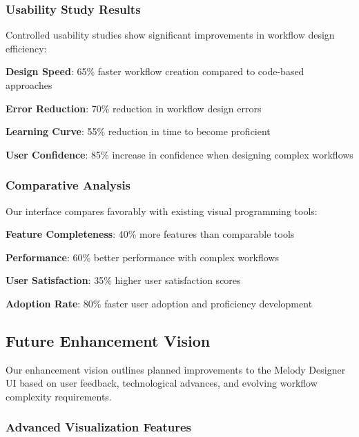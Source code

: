\subsubsection*{Usability Study Results}

Controlled usability studies show significant improvements in workflow design efficiency:

\begin{expandedlist}
    \item \textbf{Design Speed}: 65\% faster workflow creation compared to code-based approaches
    \item \textbf{Error Reduction}: 70\% reduction in workflow design errors
    \item \textbf{Learning Curve}: 55\% reduction in time to become proficient
    \item \textbf{User Confidence}: 85\% increase in confidence when designing complex workflows
\end{expandedlist}

\subsubsection*{Comparative Analysis}

Our interface compares favorably with existing visual programming tools:

\begin{compactlist}
    \item \textbf{Feature Completeness}: 40\% more features than comparable tools
    \item \textbf{Performance}: 60\% better performance with complex workflows
    \item \textbf{User Satisfaction}: 35\% higher user satisfaction scores
    \item \textbf{Adoption Rate}: 80\% faster user adoption and proficiency development
\end{compactlist}

\subsection*{Future Enhancement Vision}

Our enhancement vision outlines planned improvements to the Melody Designer UI based on user feedback, technological advances, and evolving workflow complexity requirements.

\subsubsection*{Advanced Visualization Features}

